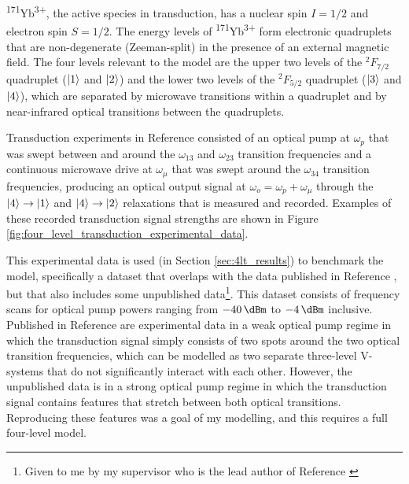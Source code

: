 \textsuperscript{171}Yb\textsuperscript{3+}, the active species in transduction, has a nuclear spin $I=1/2$ and electron spin $S=1/2$. The energy levels of \textsuperscript{171}Yb\textsuperscript{3+} form electronic quadruplets that are non-degenerate (Zeeman-split) in the presence of an external magnetic field. The four levels relevant to the model are the upper two levels of the $^2F_{7/2}$ quadruplet ($\left|1\right\rangle$ and $\left|2\right\rangle$) and the lower two levels of the $^2F_{5/2}$ quadruplet ($\left|3\right\rangle$ and $\left|4\right\rangle$), which are separated by microwave transitions within a quadruplet and by near-infrared optical transitions between the quadruplets.

Transduction experiments in Reference \cite{bartholomew_chip_2020} consisted of an optical pump at $\omega_p$ that was swept between and around the $\omega_{13}$ and $\omega_{23}$ transition frequencies and a continuous microwave drive at $\omega_\mu$ that was swept around the $\omega_{34}$ transition frequencies, producing an optical output signal at $\omega_o = \omega_p + \omega_\mu$ through the $\left|4\right\rangle\to\left|1\right\rangle$ and $\left|4\right\rangle\to\left|2\right\rangle$ relaxations that is measured and recorded. Examples of these recorded transduction signal strengths are shown in Figure \ref{fig:four_level_transduction_experimental_data}.

This experimental data is used (in Section \ref{sec:4lt_results}) to benchmark the model, specifically a dataset that overlaps with the data published in Reference \cite{bartholomew_chip_2020}, but that also includes some unpublished data\footnote{Given to me by my supervisor who is the lead author of Reference \cite{bartholomew_chip_2020}}. This dataset consists of frequency scans for optical pump powers ranging from $\qty{-40}{\dBm}$ to $\qty{-4}{\dBm}$ inclusive. Published in Reference \cite{bartholomew_chip_2020} are experimental data in a weak optical pump regime in which the transduction signal simply consists of two spots around the two optical transition frequencies, which can be modelled as two separate three-level V-systems that do not significantly interact with each other. However, the unpublished data is in a strong optical pump regime in which the transduction signal contains features that stretch between both optical transitions. Reproducing these features was a goal of my modelling, and this requires a full four-level model.

